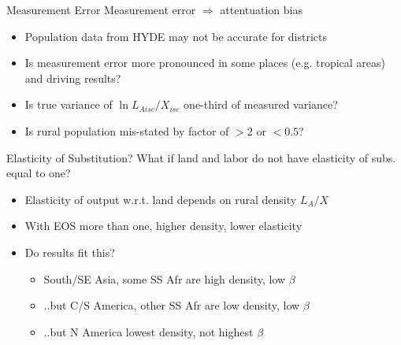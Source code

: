 \documentclass[10pt, xcolor=dvipsnames]{beamer}
\begin{document}
\begin{frame}{Measurement Error}\label{measure}
Measurement error $\Rightarrow$ attentuation bias
\begin{itemize}
  \item Population data from HYDE may not be accurate for districts
  \item Is measurement error more pronounced in some places (e.g. tropical areas) and driving results?
  \item Is true variance of $\ln L_{Aisc}/X_{isc}$ one-third of measured variance?
  \item Is rural population mis-stated by factor of $>2$ or $<0.5$?
\end{itemize}

\hfill \hyperlink{robustness}{}
\end{frame}

\begin{frame}{Elasticity of Substitution?}\label{eos}
What if land and labor do not have elasticity of subs. equal to one?
\begin{itemize}
  \item Elasticity of output w.r.t. land depends on rural density $L_A/X$
  \item With EOS more than one, higher density, lower elasticity
  \item Do results fit this?
  \begin{itemize}
    \item South/SE Asia, some SS Afr are high density, low $\beta$
    \item ..but C/S America, other SS Afr are low density, low $\beta$
    \item ..but N America lowest density, not highest $\beta$
  \end{itemize}
\end{itemize}
\hfill \hyperlink{rurdbeta}{}
\hfill \hyperlink{robustness}{}
\end{frame}
\end{document}
